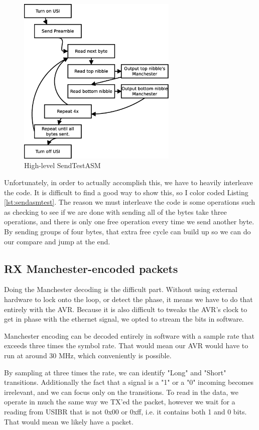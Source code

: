 \documentclass{article}
\begin{document}
\begin{figure}
    \centering
    \includegraphics[width=3.0in]{sendexplain}
    \caption{High-level SendTestASM}
    \label{sendexplain}
\end{figure}

Unfortunately, in order to actually accomplish this, we have to heavily interleave the code.  It is 
difficult to find a good way to show this, so I color coded Listing \ref{lst:sendasmtest}.  The 
reason we must interleave the code is some operations such as checking to see if we are done with
sending all of the bytes take three operations, and there is only one free operation every time
we send another byte.  By sending groups of four bytes, that extra free cycle can build up so we can
do our compare and jump at the end.

\subsection{RX Manchester-encoded packets}
Doing the Manchester decoding is the difficult part.  Without using external hardware to lock onto
the loop, or detect the phase, it means we have to do that entirely with the AVR.  Because it is
also difficult to tweaks the AVR's clock to get in phase with the ethernet signal, we opted to 
stream the bits in software.

Manchester encoding can be decoded entirely in software with a sample rate that exceeds three
times the symbol rate.  That would mean our AVR would have to run at around 30 MHz, which
conveniently is possible.

By sampling at three times the rate, we can identify "Long" and "Short" transitions.  Additionally
the fact that a signal is a "1" or a "0" incoming becomes irrelevant, and we can focus only on
the transitions.  To read in the data, we operate in much the same way we TX'ed the packet, however
we wait for a reading from USIBR that is not 0x00 or 0xff, i.e. it contains both 1 and 0 bits. That
would mean we likely have a packet.
\end{document}
